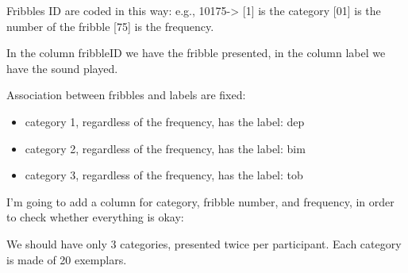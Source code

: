 \documentclass[
]{article}
\newenvironment{Shaded}{\begin{snugshade}}{\end{snugshade}}
\newcommand{\DecValTok}[1]{\textcolor[rgb]{0.00,0.00,0.81}{#1}}
\newcommand{\KeywordTok}[1]{\textcolor[rgb]{0.13,0.29,0.53}{\textbf{#1}}}
\newcommand{\NormalTok}[1]{#1}
\newcommand{\OperatorTok}[1]{\textcolor[rgb]{0.81,0.36,0.00}{\textbf{#1}}}
\newcommand{\StringTok}[1]{\textcolor[rgb]{0.31,0.60,0.02}{#1}}
\begin{document}
Fribbles ID are coded in this way: e.g., 10175-\textgreater{} {[}1{]} is
the category {[}01{]} is the number of the fribble {[}75{]} is the
frequency.

In the column fribbleID we have the fribble presented, in the column
label we have the sound played.

Association between fribbles and labels are fixed:

\begin{itemize}
\item
  category 1, regardless of the frequency, has the label: dep
\item
  category 2, regardless of the frequency, has the label: bim
\item
  category 3, regardless of the frequency, has the label: tob
\end{itemize}

I'm going to add a column for category, fribble number, and frequency,
in order to check whether everything is okay:

We should have only 3 categories, presented twice per participant. Each
category is made of 20 exemplars.

\begin{Shaded}
\end{Shaded}
\end{document}
